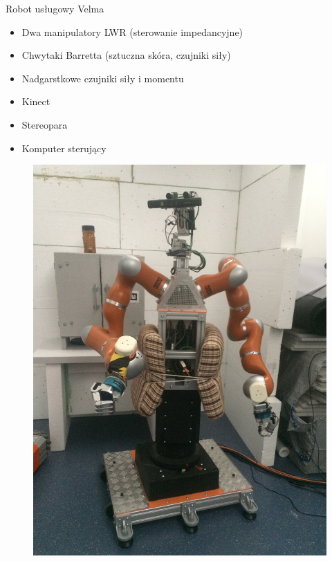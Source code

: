 \documentclass{beamer}
\begin{document}
\begin{frame}[allowframebreaks]{Robot usługowy Velma}
\begin{itemize}
\item Dwa manipulatory LWR (sterowanie impedancyjne)
\item Chwytaki Barretta (sztuczna skóra, czujniki siły)
\item Nadgarstkowe czujniki siły i momentu
\item Kinect
\item Stereopara
\item Komputer sterujący
\end{itemize}
\framebreak
\begin{figure}[h]
	\centering
	\includegraphics[scale=0.07, angle =-90]{velma1}
\end{figure}

\end{frame}
\end{document}
